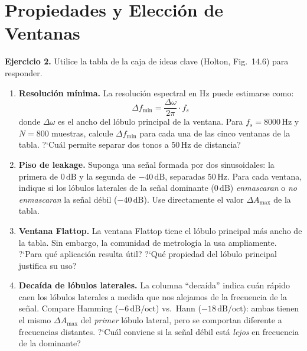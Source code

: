 \documentclass[11pt, a4paper]{article}
\begin{document}
\section{Propiedades y Elecci\'on de Ventanas}

\begin{exbox}
\textbf{Ejercicio 2.}
Utilice la tabla de la caja de ideas clave (Holton, Fig.~14.6) para responder.

\begin{enumerate}[label=\textbf{\alph*)}]

  \item \textbf{Resoluci\'on m\'inima.}
  La resoluci\'on espectral en Hz puede estimarse como:
  $$\Delta f_{\min} = \frac{\Delta\omega}{2\pi} \cdot f_s$$
  donde $\Delta\omega$ es el ancho del l\'obulo principal de la ventana.
  Para $f_s = 8000\,\text{Hz}$ y $N = 800$ muestras, calcule $\Delta f_{\min}$
  para cada una de las cinco ventanas de la tabla.
  ?`Cu\'al permite separar dos tonos a $50\,\text{Hz}$ de distancia?

  \item \textbf{Piso de leakage.}
  Suponga una se\~nal formada por dos sinusoidales: la primera de $0\,\text{dB}$
  y la segunda de $-40\,\text{dB}$, separadas $50\,\text{Hz}$.
  Para cada ventana, indique si los l\'obulos laterales de la se\~nal dominante
  ($0\,\text{dB}$) \emph{enmascaran} o \emph{no enmascaran} la se\~nal d\'ebil ($-40\,\text{dB}$).
  Use directamente el valor $\Delta A_{\max}$ de la tabla.

  \item \textbf{Ventana Flattop.}
  La ventana Flattop tiene el l\'obulo principal m\'as ancho de la tabla.
  Sin embargo, la comunidad de metrolog\'ia la usa ampliamente.
  ?`Para qu\'e aplicaci\'on resulta \'util? ?`Qu\'e propiedad del l\'obulo principal
  justifica su uso?

  \item \textbf{Decaída de lóbulos laterales.}
  La columna ``decaída'' indica cu\'an r\'apido caen los l\'obulos laterales
  a medida que nos alejamos de la frecuencia de la se\~nal.
  Compare Hamming ($-6\,\text{dB/oct}$) vs.\ Hann ($-18\,\text{dB/oct}$):
  ambas tienen el mismo $\Delta A_{\max}$ del \emph{primer} l\'obulo lateral,
  pero se comportan diferente a frecuencias distantes.
  ?`Cu\'al conviene si la se\~nal d\'ebil est\'a \emph{lejos} en frecuencia de la dominante?

\end{enumerate}
\end{exbox}
\end{document}
